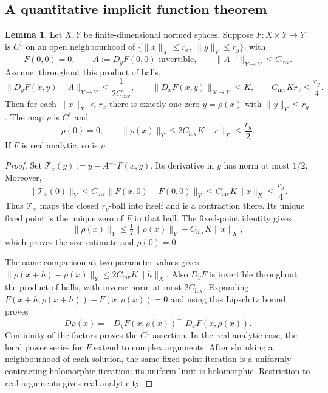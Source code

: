 \documentclass[10pt,reqno]{amsart}
\theoremstyle{definition}
\newtheorem{lemma}[definition]{Lemma}
\theoremstyle{remark}
\numberwithin{equation}{section}
\numberwithin{figure}{section}
\begin{document}
\subsection{A quantitative implicit function theorem}
\begin{lemma}\label{lem:quantitative-implicit-function}
Let $X,Y$ be finite-dimensional normed spaces. Suppose $F:X\times Y\to Y$
is $C^1$ on an open neighbourhood of
$\{\|x\|_X\le r_x,\ \|y\|_Y\le r_y\}$, with
\begin{equation}\label{eq:abstract-implicit-base}
F(0,0)=0,\qquad A:=D_yF(0,0)\text{ invertible},\qquad
\|A^{-1}\|_{Y\to Y}\le C_{\mathrm{inv}}.
\end{equation}
Assume, throughout this product of balls,
\begin{equation}\label{eq:abstract-implicit-inputs}
\|D_yF(x,y)-A\|_{Y\to Y}\le\frac1{2C_{\mathrm{inv}}},\qquad
\|D_xF(x,y)\|_{X\to Y}\le K,\qquad C_{\mathrm{inv}}Kr_x\le\frac{r_y}{4}.
\end{equation}
Then for each $\|x\|_X<r_x$ there is exactly one zero $y=\rho(x)$ with
$\|y\|_Y\le r_y$. The map $\rho$ is $C^1$ and
\begin{equation}\label{eq:abstract-implicit-conclusion}
\rho(0)=0,\qquad \|\rho(x)\|_Y\le2C_{\mathrm{inv}}K\|x\|_X\le\frac{r_y}{2}.
\end{equation}
If $F$ is real analytic, so is $\rho$.
\end{lemma}
\begin{proof}
Set $\mathcal T_x(y):=y-A^{-1}F(x,y)$. Its derivative in $y$ has norm
at most $1/2$. Moreover,
\begin{equation}\label{eq:abstract-contraction-centre}
\|\mathcal T_x(0)\|_Y
\le C_{\mathrm{inv}}\|F(x,0)-F(0,0)\|_Y\le C_{\mathrm{inv}}K\|x\|_X\le\frac{r_y}{4}.
\end{equation}
Thus $\mathcal T_x$ maps the closed $r_y$-ball into itself and is a
contraction there. Its unique fixed point is the unique zero of $F$ in
that ball. The fixed-point identity gives
\begin{equation}\label{eq:abstract-fixed-point-size}
\|\rho(x)\|_Y\le\tfrac12\|\rho(x)\|_Y+C_{\mathrm{inv}}K\|x\|_X,
\end{equation}
which proves the size estimate and $\rho(0)=0$.

The same comparison at two parameter values gives
$\|\rho(x+h)-\rho(x)\|_Y\le2C_{\mathrm{inv}}K\|h\|_X$. Also $D_yF$ is invertible
throughout the product of balls, with inverse norm at most $2C_{\mathrm{inv}}$.
Expanding $F(x+h,\rho(x+h))-F(x,\rho(x))=0$ and using this Lipschitz
bound proves
\begin{equation}\label{eq:implicit-map-derivative}
D\rho(x)=-D_yF(x,\rho(x))^{-1}D_xF(x,\rho(x)).
\end{equation}
Continuity of the factors proves the $C^1$ assertion. In the real-analytic
case, the local power series for $F$ extend to complex arguments.
After shrinking a neighbourhood of each solution, the same fixed-point
iteration is a uniformly contracting holomorphic iteration; its uniform
limit is holomorphic. Restriction to real arguments gives real analyticity.
\end{proof}
\end{document}
